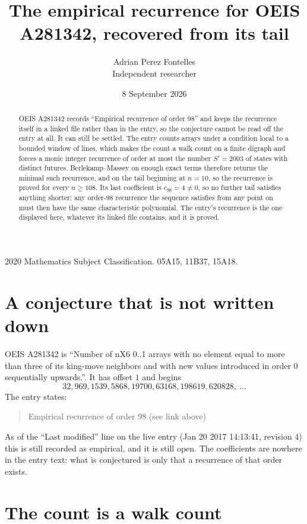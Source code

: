 \documentclass[11pt,a4paper]{article}
\title{The empirical recurrence for OEIS A281342, recovered from its tail}
\author{Adrian Perez Fontelles\\ \small Independent researcher}
\date{8 September 2026}
\theoremstyle{plain}
\theoremstyle{definition}
\begin{document}
\maketitle

\begin{abstract}
OEIS A281342 records ``Empirical recurrence of order $98$'' and keeps the recurrence itself in
a linked file rather than in the entry, so the conjecture cannot be read off the entry at all.
It can still be settled. The entry counts arrays under a condition local to a bounded window of
lines, which makes the count a walk count on a finite digraph and forces a monic integer
recurrence of order at most the number $S'=2003$ of states with distinct futures. Berlekamp--Massey on
enough exact terms therefore returns the minimal such recurrence, and on the tail beginning at $n=10$, so the recurrence is proved for every $n\ge108$.
Its last coefficient is $c_{98}=4\neq0$, so no further tail satisfies anything
shorter; any order-$98$ recurrence the sequence satisfies from any point on must then have
the same characteristic polynomial. The entry's recurrence is the one displayed here, whatever
its linked file contains, and it is proved.
\end{abstract}

\noindent\small 2020 Mathematics Subject Classification. 05A15, 11B37, 15A18.\normalsize

\section{A conjecture that is not written down}

OEIS A281342 is ``Number of nX6 0..1 arrays with no element equal to more than three of its king-move neighbors and with new values introduced in order 0 sequentially upwards.''. It has offset $1$ and begins
\[
32, 969, 1539, 5868, 19700, 63168, 198619, 620828,\ \dots
\]
The entry states:
\begin{quote}
Empirical recurrence of order 98 (see link above)
\end{quote}
As of the ``Last modified'' line on the live entry (Jan 20 2017 14:13:41, revision 4)
this is still recorded as empirical, and it is still open. The coefficients are nowhere in the
entry text: what is conjectured is only that a recurrence of that order exists.

\section{The count is a walk count}
\end{document}
